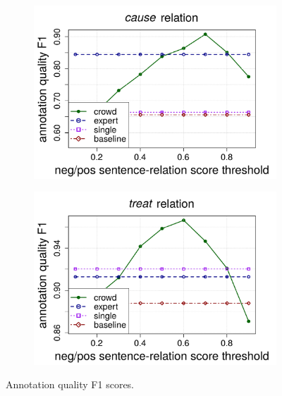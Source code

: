 \begin{figure}[htb!]
\centering

\begin{subfigure}{.5\textwidth}
\includegraphics[width=\linewidth]{img/cause_ann_quality.pdf}
\end{subfigure}%
\begin{subfigure}{.5\textwidth}
\includegraphics[width=\linewidth]{img/treat_ann_quality.pdf}
\end{subfigure}
\caption{Annotation quality F1 scores.}
\label{fig:ann_quality}
\end{figure}

